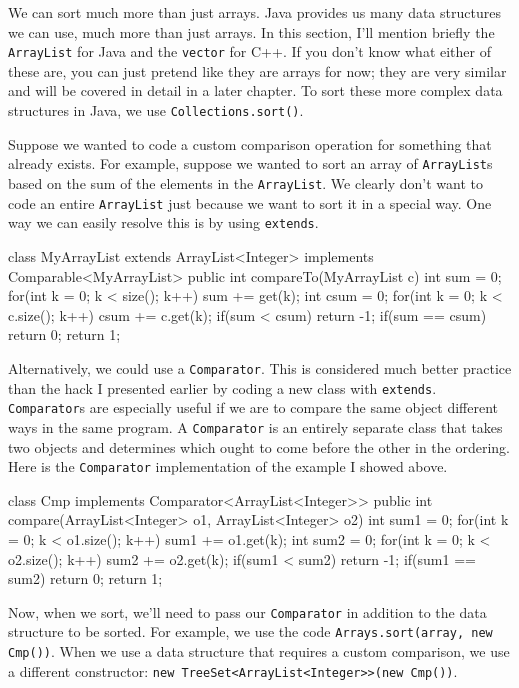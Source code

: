We can sort much more than just arrays. Java provides us many data structures we can use, much more than just arrays. In this section, I'll mention briefly the \texttt{ArrayList} for Java and the \texttt{vector} for C++. If you don't know what either of these are, you can just pretend like they are arrays for now; they are very similar and will be covered in detail in a later chapter. To sort these more complex data structures in Java, we use \texttt{Collections.sort()}.

Suppose we wanted to code a custom comparison operation for something that already exists. For example, suppose we wanted to sort an array of \texttt{ArrayList}s based on the sum of the elements in the \texttt{ArrayList}. We clearly don't want to code an entire \texttt{ArrayList} just because we want to sort it in a special way. One way we can easily resolve this is by using \texttt{extends}.

\begin{mylstlisting}
class MyArrayList extends ArrayList<Integer> implements Comparable<MyArrayList> {
	public int compareTo(MyArrayList c) {
		int sum = 0;
		for(int k = 0; k < size(); k++) {
			sum += get(k);
		}
		int csum = 0;
		for(int k = 0; k < c.size(); k++) {
			csum += c.get(k);
		}
		if(sum < csum) return -1;
		if(sum == csum) return 0;
		return 1;
	}
}
\end{mylstlisting}

Alternatively, we could use a \texttt{Comparator}. This is considered much better practice than the hack I presented earlier by coding a new class with \texttt{extends}. \texttt{Comparator}s are especially useful if we are to compare the same object different ways in the same program. A \texttt{Comparator} is an entirely separate class that takes two objects and determines which ought to come before the other in the ordering. Here is the \texttt{Comparator} implementation of the example I showed above.

\begin{mylstlisting}
class Cmp implements Comparator<ArrayList<Integer>> {
	public int compare(ArrayList<Integer> o1, ArrayList<Integer> o2) {
		int sum1 = 0;
		for(int k = 0; k < o1.size(); k++) {
			sum1 += o1.get(k);
		}
		int sum2 = 0;
		for(int k = 0; k < o2.size(); k++) {
			sum2 += o2.get(k);
		}
		if(sum1 < sum2) return -1;
		if(sum1 == sum2) return 0;
		return 1;
	}
}
\end{mylstlisting}

Now, when we sort, we'll need to pass our \texttt{Comparator} in addition to the data structure to be sorted. For example, we use the code \texttt{Arrays.sort(array, new Cmp())}. When we use a data structure that requires a custom comparison, we use a different constructor: \texttt{new TreeSet<ArrayList<Integer>>(new Cmp())}.

